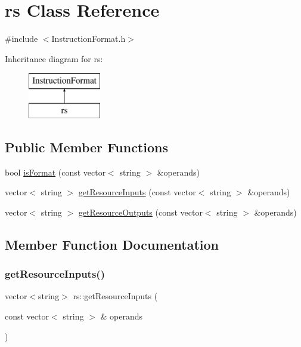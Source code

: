 \hypertarget{classrs}{}\section{rs Class Reference}
\label{classrs}


{\ttfamily \#include $<$Instruction\+Format.\+h$>$}

Inheritance diagram for rs\+:\begin{figure}[H]
\begin{center}
\leavevmode
\includegraphics[height=2.000000cm]{classrs}
\end{center}
\end{figure}
\subsection*{Public Member Functions}
\begin{DoxyCompactItemize}
\item 
bool \hyperlink{classrs_a6b8aa703ea54d95ddb7badc5c95c29f5}{is\+Format} (const vector$<$ string $>$ \&operands)
\item 
vector$<$ string $>$ \hyperlink{classrs_a5bac2f73d84e28ab6037a368fab75d91}{get\+Resource\+Inputs} (const vector$<$ string $>$ \&operands)
\item 
vector$<$ string $>$ \hyperlink{classrs_aa6a9c35c6eb4b5f8cfc8c41484b5a0b9}{get\+Resource\+Outputs} (const vector$<$ string $>$ \&operands)
\end{DoxyCompactItemize}


\subsection{Member Function Documentation}
\mbox{\label{classrs_a5bac2f73d84e28ab6037a368fab75d91}} 
\subsubsection{\texorpdfstring{get\+Resource\+Inputs()}{getResourceInputs()}}
{\footnotesize\ttfamily vector$<$string$>$ rs\+::get\+Resource\+Inputs (\begin{DoxyParamCaption}\item[{const vector$<$ string $>$ \&}]{operands }\end{DoxyParamCaption})\hspace{0.3cm}{\ttfamily [virtual]}}

